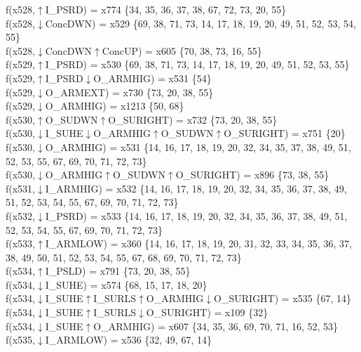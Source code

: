 f(x528,$\uparrow$I\_PSRD) = x774 \{34, 35, 36, 37, 38, 67, 72, 73, 20, 55\} \\  
f(x528,$\downarrow$ConcDWN) = x529 \{69, 38, 71, 73, 14, 17, 18, 19, 20, 49, 51, 52, 53, 54, 55\} \\  
f(x528,$\downarrow$ConcDWN$\uparrow$ConcUP) = x605 \{70, 38, 73, 16, 55\} \\  
f(x529,$\uparrow$I\_PSRD) = x530 \{69, 38, 71, 73, 14, 17, 18, 19, 20, 49, 51, 52, 53, 55\} \\  
f(x529,$\uparrow$I\_PSRD$\downarrow$O\_ARMHIG) = x531 \{54\} \\  
f(x529,$\downarrow$O\_ARMEXT) = x730 \{73, 20, 38, 55\} \\  
f(x529,$\downarrow$O\_ARMHIG) = x1213 \{50, 68\} \\  
f(x530,$\uparrow$O\_SUDWN$\uparrow$O\_SURIGHT) = x732 \{73, 20, 38, 55\} \\  
f(x530,$\downarrow$I\_SUHE$\downarrow$O\_ARMHIG$\uparrow$O\_SUDWN$\uparrow$O\_SURIGHT) = x751 \{20\} \\  
f(x530,$\downarrow$O\_ARMHIG) = x531 \{14, 16, 17, 18, 19, 20, 32, 34, 35, 37, 38, 49, 51, 52, 53, 55, 67, 69, 70, 71, 72, 73\} \\  
f(x530,$\downarrow$O\_ARMHIG$\uparrow$O\_SUDWN$\uparrow$O\_SURIGHT) = x896 \{73, 38, 55\} \\  
f(x531,$\downarrow$I\_ARMHIG) = x532 \{14, 16, 17, 18, 19, 20, 32, 34, 35, 36, 37, 38, 49, 51, 52, 53, 54, 55, 67, 69, 70, 71, 72, 73\} \\  
f(x532,$\downarrow$I\_PSRD) = x533 \{14, 16, 17, 18, 19, 20, 32, 34, 35, 36, 37, 38, 49, 51, 52, 53, 54, 55, 67, 69, 70, 71, 72, 73\} \\  
f(x533,$\uparrow$I\_ARMLOW) = x360 \{14, 16, 17, 18, 19, 20, 31, 32, 33, 34, 35, 36, 37, 38, 49, 50, 51, 52, 53, 54, 55, 67, 68, 69, 70, 71, 72, 73\} \\  
f(x534,$\uparrow$I\_PSLD) = x791 \{73, 20, 38, 55\} \\  
f(x534,$\downarrow$I\_SUHE) = x574 \{68, 15, 17, 18, 20\} \\  
f(x534,$\downarrow$I\_SUHE$\uparrow$I\_SURLS$\uparrow$O\_ARMHIG$\downarrow$O\_SURIGHT) = x535 \{67, 14\} \\  
f(x534,$\downarrow$I\_SUHE$\uparrow$I\_SURLS$\downarrow$O\_SURIGHT) = x109 \{32\} \\  
f(x534,$\downarrow$I\_SUHE$\uparrow$O\_ARMHIG) = x607 \{34, 35, 36, 69, 70, 71, 16, 52, 53\} \\  
f(x535,$\downarrow$I\_ARMLOW) = x536 \{32, 49, 67, 14\} \\  
